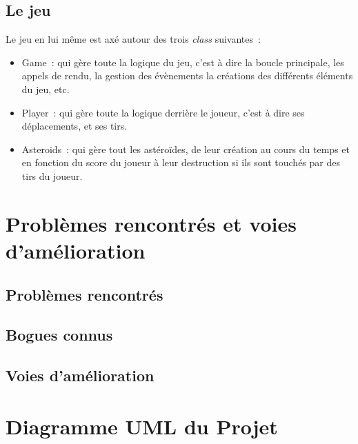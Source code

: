 \documentclass[10pt, french, a4paper]{report}
\newcommand{\class}[1]{{\codefont \NoAutoSpacing \mbox{#1}}}
\begin{document}

\section{Le jeu}

Le jeu en lui même est axé autour des trois \textit{class} suivantes~:
\begin{itemize}
	\item \class{Game}~: qui gère toute la logique du jeu, c'est à dire la boucle
		  principale, les appels de rendu, la gestion des évènements la créations
		  des différents éléments du jeu, etc.
	\item \class{Player}~: qui gère toute la logique derrière le joueur, c'est à dire
		  ses déplacements, et ses tirs.
	\item \class{Asteroids}~: qui gère tout les astéroïdes, de leur création au cours
		  du temps et en fonction du score du joueur à leur destruction si ils sont
		  touchés par des tirs du joueur. 
\end{itemize}


\chapter{Problèmes rencontrés et voies d'amélioration}

\section{Problèmes rencontrés}


\section{Bogues connus}


\section{Voies d'amélioration}


\appendix
\addappheadtotoc

\chapter{Diagramme UML du Projet}
\label{chap:digramme-uml}


\end{document}
